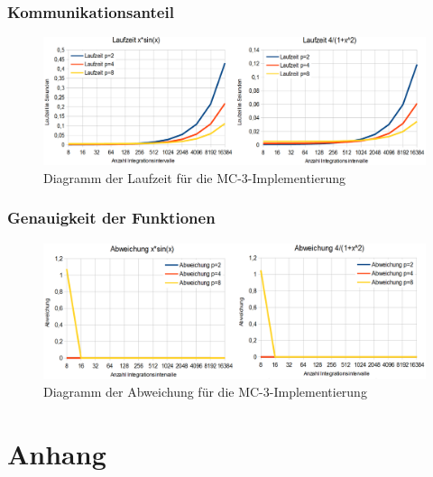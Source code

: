 \documentclass[a4paper,12pt]{scrartcl}
\begin{document}
\subsubsection{Kommunikationsanteil}
\begin{figure}[htb]
  \begin{center}
    \includegraphics[width=1\hsize]{../mc3_laufzeit.png}
  \end{center}
  \caption{\label{mc3kommanteil}
    Diagramm der Laufzeit f\"ur die MC-3-Implementierung}
\end{figure}

\subsubsection{Genauigkeit der Funktionen}
\begin{figure}[htb]
  \begin{center}
    \includegraphics[width=1\hsize]{../mc3_abweichung.png}
  \end{center}
  \caption{\label{mc3genauigkeit}
    Diagramm der Abweichung f\"ur die MC-3-Implementierung}
\end{figure}

\section{Anhang}
\end{document}
